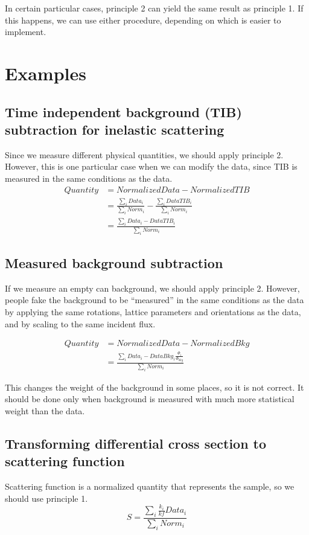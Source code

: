 \documentclass{article}
\begin{document}
In certain particular cases, principle 2 can yield the same result as principle 1. If this happens, we can use either procedure, depending on which is easier to implement.

\section{Examples}
\subsection{Time independent background (TIB) subtraction for inelastic scattering}
Since we measure different physical quantities, we should apply principle 2. However, this is one particular case when we can modify the data, since TIB is measured in the same conditions as the data.
\begin{align}
Quantity&=NormalizedData-NormalizedTIB\\
&=\frac{\sum_{i} Data_i}{\sum_{i} Norm_i}-\frac{\sum_{i} DataTIB_i}{\sum_{i} Norm_i}\\
&=\frac{\sum_{i} Data_i-DataTIB_i}{\sum_{i} Norm_i}
\end{align}

\subsection{Measured background subtraction}
If we measure an empty can background, we should apply principle 2. 
However, people fake the background to be ``measured'' in the same conditions as the data by applying the same rotations, lattice parameters and orientations as the data, and by scaling to the same incident flux.

\begin{align}
Quantity&=NormalizedData-NormalizedBkg\\
&=\frac{\sum_{i} Data_i-DataBkg_i \frac{\Phi_i}{\Phi_{bkg}}}{\sum_{i} Norm_i}
\end{align}

This changes the weight of the background in some places, so it is not correct. It should be done only when background is measured with much more statistical weight than the data.

\subsection{Transforming differential cross section to scattering function}
Scattering function is a normalized quantity that represents the sample, so we should use principle 1.
\begin{equation}
S=\frac{\sum_{i} \frac{k_i}{kf} Data_i}{\sum_{i} Norm_i}
\end{equation}
\end{document}
